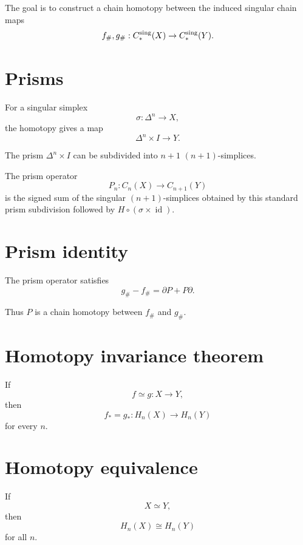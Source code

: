 The goal is to construct a chain homotopy between the induced singular chain
maps
\[
f_\#,g_\#:C_*^{\rm sing}(X)\to C_*^{\rm sing}(Y).
\]

\section{Prisms}

For a singular simplex
\[
\sigma:\Delta^n\to X,
\]
the homotopy gives a map
\[
\Delta^n\times I\to Y.
\]

The prism \(\Delta^n\times I\) can be subdivided into \(n+1\)
\((n+1)\)-simplices.

\begin{definition}
\label{def:viii20-prism}
The prism operator
\[
P_n:C_n(X)\to C_{n+1}(Y)
\]
is the signed sum of the singular \((n+1)\)-simplices obtained by this
standard prism subdivision followed by \(H\circ(\sigma\times\operatorname{id})\).
\end{definition}

\section{Prism identity}

\begin{theorem}
\label{thm:viii20-prism-identity}
The prism operator satisfies
\[
g_\#-f_\#
=
\partial P+P\partial.
\]
\end{theorem}

Thus \(P\) is a chain homotopy between \(f_\#\) and \(g_\#\).

\section{Homotopy invariance theorem}

\begin{theorem}
\label{thm:viii20-homotopy-invariance}
If
\[
f\simeq g:X\to Y,
\]
then
\[
f_*=g_*:H_n(X)\to H_n(Y)
\]
for every \(n\).
\end{theorem}

\section{Homotopy equivalence}

\begin{corollary}
\label{cor:viii20-homotopy-equivalence}
If
\[
X\simeq Y,
\]
then
\[
H_n(X)\cong H_n(Y)
\]
for all \(n\).
\end{corollary}


